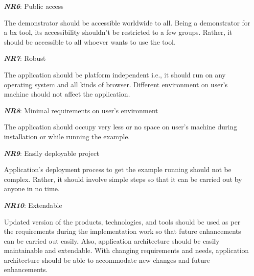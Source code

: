 \textbf{\textit{NR6}}: Public access

The demonstrator should be accessible worldwide to all. Being a demonstrator for a bx tool, its accessibility shouldn't be restricted to a few groups. Rather, it should be accessible to all whoever wants to use the tool.

\textbf{\textit{NR7}}: Robust

The application should be platform independent i.e., it should run on any operating system and all kinds of browser. Different environment on user's machine should not affect the application.

\textbf{\textit{NR8}}: Minimal requirements on user's environment

The application should occupy very less or no space on user's machine during installation or while running the example. 
 
\textbf{\textit{NR9}}: Easily deployable project

Application's deployment process to get the example running should not be complex. Rather, it should involve simple steps so that it can be carried out by anyone in no time.

\textbf{\textit{NR10}}: Extendable

Updated version of the products, technologies, and tools should be used as per the requirements during the implementation work so that future enhancements can be carried out easily. Also, application architecture should be easily maintainable and extendable. With changing requirements and needs, application architecture should be able to accommodate new changes and future enhancements.
